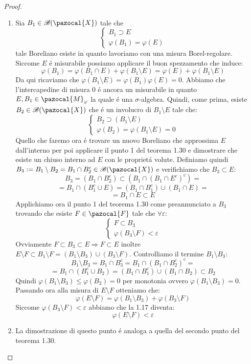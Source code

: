 \documentclass[11pt,a4paper]{report}
\theoremstyle{plain}
\theoremstyle{definition}
\newcommand{\M}{\pazocal{M}_\varphi}
\newcommand{\X}{\pazocal{X}}
\newcommand{\F}{\pazocal{F}}
\newcommand{\B}{\mathcal{B}}
\begin{document}
\begin{proof}
	\begin{enumerate}
		\item Sia $B_1 \in \B(\X)$ tale che
			\[
				\begin{cases}
					B_1 \supset E\\
					\varphi(B_1) = \varphi(E)
				\end{cases}			
			\]		
		  tale Boreliano esiste in quanto lavoriamo con una misura Borel-regolare. Siccome $E$ \'e misurabile possiamo applicare il buon spezzamento che induce:
		  \[
			\varphi(B_1) = \varphi(B_1 \cap E) + \varphi(B_1 \setminus E) = \varphi(E) + \varphi(B_1 \setminus E)
		  \]
		  Da qui ricaviamo che $\varphi(B_1 \setminus E) = \varphi(B_1) \varphi(E) = 0$.
		  Abbiamo che l'intercapedine di misura 0 \'e ancora un misurabile in quanto $E, B_1 \in \M$ la quale \'e una $\sigma$-algebra.
		  Quindi, come prima, esiste $B_2 \in \B(\X)$ che \'e un involucro di $B_1 \setminus E$ tale che:
		  \[
			  \begin{cases}
					B_2 \supset (B_1 \setminus E)\\
					\varphi(B_2) = \varphi(B_1 \setminus E) = 0
				\end{cases}	
		  \]
		  Quello che faremo ora \'e trovare un nuovo Boreliano che approssima $E$ dall'interno per poi applicare il punto 1 del teorema 1.30 e dimostrare che esiste un chiuso interno ad $E$ con le propriet\'a volute.
		  Definiamo quindi $B_3 := B_1 \setminus B_2 = B_1 \cap B_2^c \in \B(\X)$ e verifichiamo che $B_3 \subset E$:
		  \[
			B_3 = (B_1 \cap B_2^c) \subset (B_1 \cap (B_1 \cap E^c)^c) = 		  
		  \]
		  \[
		  	= B_1 \cap (B_1^c \cup E) = (B_1 \cap B_1^c) \cup (B_1 \cap E) = 
		  \]
		  \[
			= B_1 \cap E \subset E	  
		  \]
		  Applichiamo ora il punto 1 del teorema 1.30 come preannunciato a $B_3$ trovando che esiste $F \in \F$ tale che $\forall \varepsilon$:
		   \[
			  \begin{cases}
					F \subset B_3\\
					\varphi(B_3 \setminus F) < \varepsilon
				\end{cases}	
		  \]
		  Ovviamente $F \subset B_3 \subset E \Rightarrow F \subset E$ inoltre $E \setminus F \subset B_1 \setminus F = (B_1 \setminus B_3) \cup (B_3 \setminus F)$. Controlliamo il termine $B_1 \setminus B_3$:
		  \[
			B_1 \setminus B_3 = B_1 \cap B_3^c = B_1 \cap (B_1 \cap B_2^c)^c =		  
		  \]
		  \[
			= B_1 \cap (B_1^c \cup B_2) = (B_1 \cap B_1^c) \cup (B_1 \cap B_2) \subset B_2		  
		  \]
		  Quindi $\varphi(B_1 \setminus B_3) \le \varphi(B_2) = 0$ per monotonia ovvero $\varphi(B_1 \setminus B_3) = 0$.
		  Passando ora alla misura di $E \setminus F$ otteniamo che:
		  \begin{equation}
			\varphi(E \setminus F) = \varphi(B_1 \setminus B_3) + \varphi(B_3 \setminus F)		  
		  \end{equation}
		  Siccome $\varphi(B_3 \setminus F) < \varepsilon$ abbiamo che la 1.17 diventa:
		  \[
			 \varphi(E \setminus F) < \varepsilon 
		  \]
		\item La dimostrazione di questo punto \'e analoga a quella del secondo punto del teorema 1.30. 
	\end{enumerate}	
\end{proof}
\end{document}
